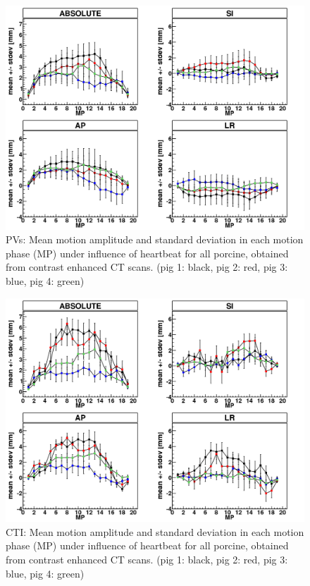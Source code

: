 \begin{figure}[H]
\begin{center}
 \includegraphics[scale=0.22]{./teile/results_porcine/Mayo_PV_HB.png}
\caption{PVs: Mean motion amplitude and standard deviation in each motion phase (MP) under influence of heartbeat for all porcine, obtained 
from contrast enhanced CT scans. (pig 1: black, pig 2: red, pig 3: blue, pig 4: green) }
\label{fig:motion_hb_all_pv}
\end{center}
\end{figure}

\newpage

\begin{figure}[H]
\begin{center}
 \includegraphics[scale=0.22]{./teile/results_porcine/Mayo_CTI_HB.png}
\caption{CTI: Mean motion amplitude and standard deviation in each motion phase (MP) under influence of heartbeat for all porcine, obtained 
from contrast enhanced CT scans. (pig 1: black, pig 2: red, pig 3: blue, pig 4: green) }
\label{fig:motion_hb_all_cti}
\end{center}
\end{figure}

